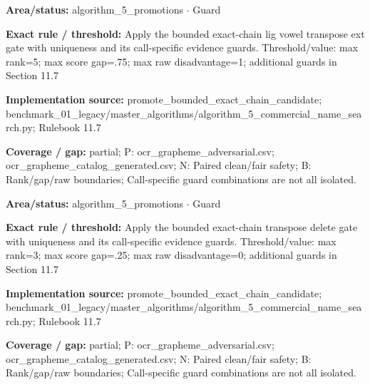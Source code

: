 \begin{tcolorbox}[enhanced,breakable,colback=white,colframe=Muted!45,boxrule=0.45pt,arc=1.5pt,left=6pt,right=6pt,top=5pt,bottom=5pt,title={\texttt{A5-CHAIN-LIG-VOWEL-TRANSPOSE-EXT}},title after break={\texttt{A5-CHAIN-LIG-VOWEL-TRANSPOSE-EXT}\ (continued)},fonttitle=\headingfont\bfseries\color{Navy},coltitle=Navy]
\textbf{Area/status:} algorithm\_\allowbreak{}5\_\allowbreak{}promotions $\boldsymbol{\cdot}$ Guard\par
\smallskip
\textbf{Exact rule / threshold:} Apply the bounded exact-chain lig vowel transpose ext gate with uniqueness and its call-specific evidence guards. Threshold/\allowbreak{}value: max rank=5; max score gap=.75; max raw disadvantage=1; additional guards in Section 11.7\par
\smallskip
\textbf{Implementation source:} promote\_\allowbreak{}bounded\_\allowbreak{}exact\_\allowbreak{}chain\_\allowbreak{}candidate; benchmark\_\allowbreak{}01\_\allowbreak{}legacy/\allowbreak{}master\_\allowbreak{}algorithms/\allowbreak{}algorithm\_\allowbreak{}5\_\allowbreak{}commercial\_\allowbreak{}name\_\allowbreak{}search.py; Rulebook 11.7\par
\smallskip
\textbf{Coverage / gap:} partial; P: ocr\_\allowbreak{}grapheme\_\allowbreak{}adversarial.csv; ocr\_\allowbreak{}grapheme\_\allowbreak{}catalog\_\allowbreak{}generated.csv; N: Paired clean/\allowbreak{}fair safety; B: Rank/\allowbreak{}gap/\allowbreak{}raw boundaries; Call-specific guard combinations are not all isolated.
\end{tcolorbox}
\begin{tcolorbox}[enhanced,breakable,colback=white,colframe=Muted!45,boxrule=0.45pt,arc=1.5pt,left=6pt,right=6pt,top=5pt,bottom=5pt,title={\texttt{A5-CHAIN-TRANSPOSE-DELETE}},title after break={\texttt{A5-CHAIN-TRANSPOSE-DELETE}\ (continued)},fonttitle=\headingfont\bfseries\color{Navy},coltitle=Navy]
\textbf{Area/status:} algorithm\_\allowbreak{}5\_\allowbreak{}promotions $\boldsymbol{\cdot}$ Guard\par
\smallskip
\textbf{Exact rule / threshold:} Apply the bounded exact-chain transpose delete gate with uniqueness and its call-specific evidence guards. Threshold/\allowbreak{}value: max rank=3; max score gap=.25; max raw disadvantage=0; additional guards in Section 11.7\par
\smallskip
\textbf{Implementation source:} promote\_\allowbreak{}bounded\_\allowbreak{}exact\_\allowbreak{}chain\_\allowbreak{}candidate; benchmark\_\allowbreak{}01\_\allowbreak{}legacy/\allowbreak{}master\_\allowbreak{}algorithms/\allowbreak{}algorithm\_\allowbreak{}5\_\allowbreak{}commercial\_\allowbreak{}name\_\allowbreak{}search.py; Rulebook 11.7\par
\smallskip
\textbf{Coverage / gap:} partial; P: ocr\_\allowbreak{}grapheme\_\allowbreak{}adversarial.csv; ocr\_\allowbreak{}grapheme\_\allowbreak{}catalog\_\allowbreak{}generated.csv; N: Paired clean/\allowbreak{}fair safety; B: Rank/\allowbreak{}gap/\allowbreak{}raw boundaries; Call-specific guard combinations are not all isolated.
\end{tcolorbox}
